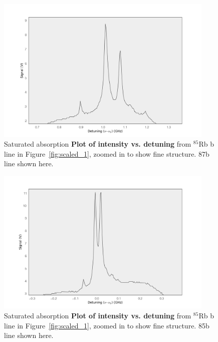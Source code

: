 \documentclass[paper=a4, fontsize=11pt]{scrartcl} %
\numberwithin{equation}{section}
\numberwithin{figure}{section}
\numberwithin{table}{section}
\begin{document}

\begin{figure}[h] \begin{center}
  \includegraphics[height=70mm]{detune1.png}
  \caption{Saturated absorption \textbf{Plot of intensity
      vs. detuning} from $^{85}$Rb b line in
    Figure~\ref{fig:scaled_1}, zoomed in to show fine structure. 87b
    line shown here.}
  \label{fig:det1}
\end{center} \end{figure}

\begin{figure}[h] \begin{center}
  \includegraphics[height=70mm]{detune2.png}
  \caption{Saturated absorption \textbf{Plot of intensity vs. detuning} from $^{85}$Rb b line in
    Figure~\ref{fig:scaled_1}, zoomed in to show fine structure. 85b
    line shown here.}
  \label{fig:det2}
\end{center} \end{figure}
\end{document}
